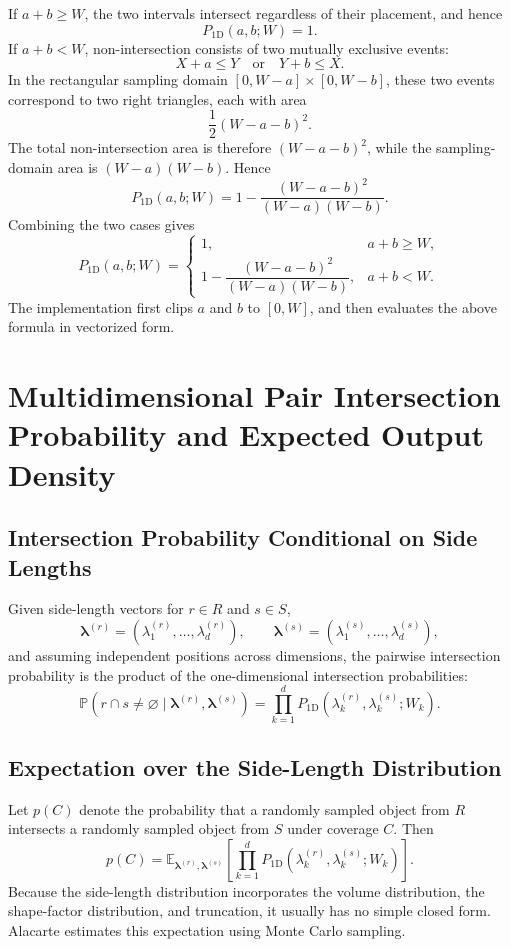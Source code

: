\documentclass[11pt,a4paper]{article}
\newcommand{\Exp}{\mathbb{E}}
\newcommand{\Prob}{\mathbb{P}}
\begin{document}
If $a+b\ge W$, the two intervals intersect regardless of their placement, and hence
\[
  P_{\mathrm{1D}}(a,b;W)=1.
\]
If $a+b<W$, non-intersection consists of two mutually exclusive events:
\[
  X+a\le Y
  \quad\text{or}\quad
  Y+b\le X.
\]
In the rectangular sampling domain $[0,W-a]\times[0,W-b]$, these two events correspond to two right triangles, each with area
\[
  \frac12(W-a-b)^2.
\]
The total non-intersection area is therefore $(W-a-b)^2$, while the sampling-domain area is $(W-a)(W-b)$. Hence
\[
  P_{\mathrm{1D}}(a,b;W)
  =
  1-
  \frac{(W-a-b)^2}{(W-a)(W-b)}.
\]
Combining the two cases gives
\[
P_{\mathrm{1D}}(a,b;W)=
\begin{cases}
1,&a+b\ge W,\\[4pt]
1-\dfrac{(W-a-b)^2}{(W-a)(W-b)},&a+b<W.
\end{cases}
\]
The implementation first clips $a$ and $b$ to $[0,W]$, and then evaluates the above formula in vectorized form.

\section{Multidimensional Pair Intersection Probability and Expected Output Density}

\subsection{Intersection Probability Conditional on Side Lengths}

Given side-length vectors for $r\in R$ and $s\in S$,
\[
  \boldsymbol\lambda^{(r)}=(\lambda^{(r)}_1,\dots,\lambda^{(r)}_d),
  \qquad
  \boldsymbol\lambda^{(s)}=(\lambda^{(s)}_1,\dots,\lambda^{(s)}_d),
\]
and assuming independent positions across dimensions, the pairwise intersection probability is the product of the one-dimensional intersection probabilities:
\[
  \Prob(r\cap s\ne\varnothing
  \mid
  \boldsymbol\lambda^{(r)},\boldsymbol\lambda^{(s)})
  =
  \prod_{k=1}^{d}
  P_{\mathrm{1D}}
  (\lambda^{(r)}_k,
   \lambda^{(s)}_k;
   W_k).
\]

\subsection{Expectation over the Side-Length Distribution}

Let $p(C)$ denote the probability that a randomly sampled object from $R$ intersects a randomly sampled object from $S$ under coverage $C$. Then
\[
  p(C)=
  \Exp_{\boldsymbol\lambda^{(r)},\boldsymbol\lambda^{(s)}}
  \left[
    \prod_{k=1}^{d}
    P_{\mathrm{1D}}
    (\lambda^{(r)}_k,
     \lambda^{(s)}_k;
     W_k)
  \right].
\]
Because the side-length distribution incorporates the volume distribution, the shape-factor distribution, and truncation, it usually has no simple closed form. Alacarte estimates this expectation using Monte Carlo sampling.
\end{document}
